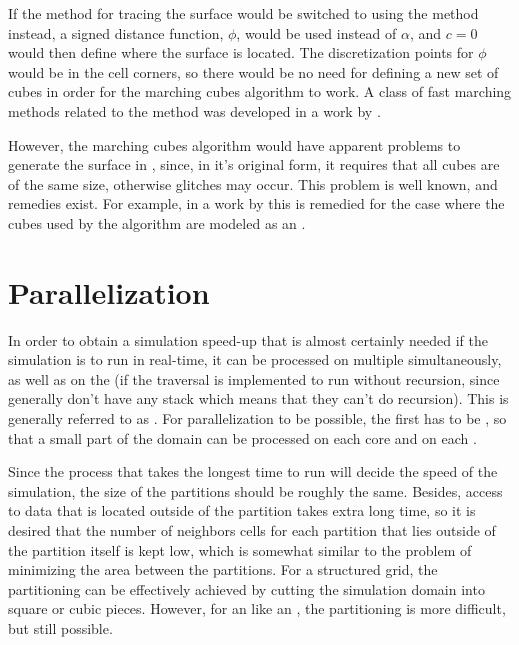 If the \VOF method for tracing the surface would be switched to using the \LS method instead, a signed distance function, $\phi$, would be used instead of $\alpha$, and $c = 0$ would then define where the surface is located. The discretization points for $\phi$ would be in the cell corners, so there would be no need for defining a new set of cubes in order for the marching cubes algorithm to work. A class of fast marching methods related to the \LS method was developed in a work by \citet{Sethian1995}.

However, the marching cubes algorithm would have apparent problems to generate the surface in , since, in it's original form, it requires that all cubes are of the same size, otherwise glitches may occur. This problem is well known, and remedies exist. For example, in a work by \citet{Lengyel2010} this is remedied for the case where the cubes used by the algorithm are modeled as an \octree.

\section{Parallelization}

In order to obtain a simulation speed-up that is almost certainly needed if the simulation is to run in real-time, it can be processed on multiple \CPUs simultaneously, as well as on the \GPU (if the \octree traversal is implemented to run without recursion, since \GPUs generally don't have any stack which means that they can't do recursion). This is generally referred to as \parallelization. For parallelization to be possible, the  first has to be \partitioned, so that a small part of the domain can be processed on each core and on each .

Since the process that takes the longest time to run will decide the speed of the simulation, the size of the partitions should be roughly the same. Besides, access to data that is located outside of the partition takes extra long time, so it is desired that the number of neighbors cells for each partition that lies outside of the partition itself is kept low, which is somewhat similar to the problem of minimizing the area between the partitions. For a structured grid, the partitioning can be effectively achieved by cutting the simulation domain into square or cubic pieces. However, for an  like an \octree, the partitioning is more difficult, but still possible.

